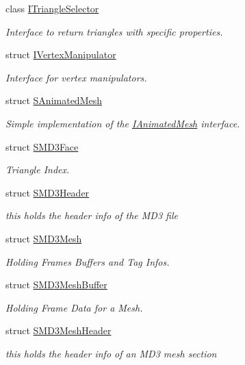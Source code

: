 \begin{DoxyCompactItemize}
class \hyperlink{classirr_1_1scene_1_1ITriangleSelector}{I\+Triangle\+Selector}
\begin{DoxyCompactList}\small\item\em Interface to return triangles with specific properties. \end{DoxyCompactList}\item 
struct \hyperlink{structirr_1_1scene_1_1IVertexManipulator}{I\+Vertex\+Manipulator}
\begin{DoxyCompactList}\small\item\em Interface for vertex manipulators. \end{DoxyCompactList}\item 
struct \hyperlink{structirr_1_1scene_1_1SAnimatedMesh}{S\+Animated\+Mesh}
\begin{DoxyCompactList}\small\item\em Simple implementation of the \hyperlink{classirr_1_1scene_1_1IAnimatedMesh}{I\+Animated\+Mesh} interface. \end{DoxyCompactList}\item 
struct \hyperlink{structirr_1_1scene_1_1SMD3Face}{S\+M\+D3\+Face}
\begin{DoxyCompactList}\small\item\em Triangle Index. \end{DoxyCompactList}\item 
struct \hyperlink{structirr_1_1scene_1_1SMD3Header}{S\+M\+D3\+Header}
\begin{DoxyCompactList}\small\item\em this holds the header info of the M\+D3 file \end{DoxyCompactList}\item 
struct \hyperlink{structirr_1_1scene_1_1SMD3Mesh}{S\+M\+D3\+Mesh}
\begin{DoxyCompactList}\small\item\em Holding Frames Buffers and Tag Infos. \end{DoxyCompactList}\item 
struct \hyperlink{structirr_1_1scene_1_1SMD3MeshBuffer}{S\+M\+D3\+Mesh\+Buffer}
\begin{DoxyCompactList}\small\item\em Holding Frame Data for a Mesh. \end{DoxyCompactList}\item 
struct \hyperlink{structirr_1_1scene_1_1SMD3MeshHeader}{S\+M\+D3\+Mesh\+Header}
\begin{DoxyCompactList}\small\item\em this holds the header info of an M\+D3 mesh section \end{DoxyCompactList}\item 

\end{DoxyCompactItemize}
